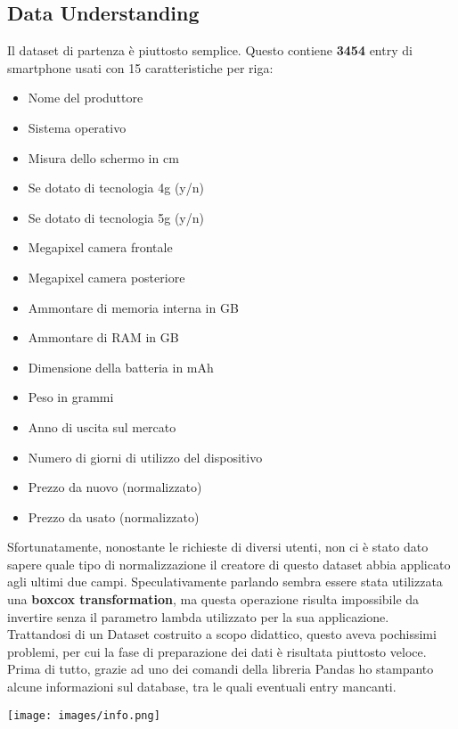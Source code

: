 \documentclass{article}
\begin{document}
    \subsection{Data Understanding}
    Il dataset di partenza è piuttosto semplice. Questo contiene \textbf{3454} entry di smartphone usati con 15 caratteristiche per riga:
    \begin{itemize}
        \item Nome del produttore
        \item Sistema operativo
        \item Misura dello schermo in cm
        \item Se dotato di tecnologia 4g (y/n)
        \item Se dotato di tecnologia 5g (y/n)
        \item Megapixel camera frontale
        \item Megapixel camera posteriore
        \item Ammontare di memoria interna in GB
        \item Ammontare di RAM in GB
        \item Dimensione della batteria in mAh
        \item Peso in grammi
        \item Anno di uscita sul mercato
        \item Numero di giorni di utilizzo del dispositivo
        \item Prezzo da nuovo (normalizzato)
        \item Prezzo da usato (normalizzato)
    \end{itemize}
    \newline
    Sfortunatamente, nonostante le richieste di diversi utenti, non ci è stato dato sapere quale tipo di normalizzazione il creatore di questo dataset abbia applicato  agli ultimi due campi. Speculativamente parlando sembra essere stata utilizzata una \textbf{boxcox transformation}, ma questa operazione risulta impossibile da invertire senza il parametro lambda utilizzato per la sua applicazione.\newline
    Trattandosi di un Dataset costruito a scopo didattico, questo aveva pochissimi problemi, per cui la fase di preparazione dei dati è risultata piuttosto veloce.\newline
    Prima di tutto, grazie ad uno dei comandi della libreria Pandas ho stampanto alcune informazioni sul database, tra le quali eventuali entry mancanti.\\
    \begin{center}
        \texttt{[image: images/info.png]}
    \end{center}
\end{document}
